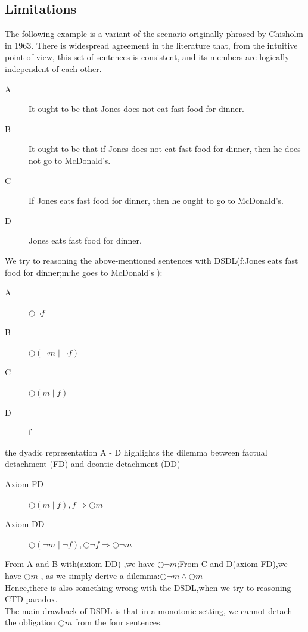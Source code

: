 \documentclass{article}
\begin{document}
\subsection{Limitations}
The following example is a variant of the scenario originally phrased by Chisholm in 1963. There is widespread agreement in the literature that, from the intuitive point of view, this set of sentences is consistent, and its members are logically independent of each other.
\begin{description}
\item[A]It ought to be that Jones does not eat fast food for dinner.
\item[B]It ought to be that if Jones does not eat fast food for dinner, then he does not go to McDonald’s.
\item[C] If Jones eats fast food for dinner, then he ought to go to McDonald’s.
\item[D]Jones eats fast food for dinner.
\end{description}
We try to reasoning the above-mentioned sentences with DSDL(f:Jones eats fast food for dinner;m:he goes to McDonald’s ):
\begin{description}
\item[A]$\bigcirc \neg f$
\item[B]$\bigcirc(\neg m \mid \neg f)$
\item[C]$\bigcirc(m\mid f)$
\item[D]f
\end{description}
the dyadic representation A - D highlights the dilemma between factual detachment (FD) and deontic detachment (DD)
\begin{description}
\item[Axiom FD]$\bigcirc(m\mid f),f \Rightarrow \bigcirc m$\\
\item[Axiom DD]$\bigcirc(\neg m \mid \neg f), \bigcirc\neg f \Rightarrow \bigcirc\neg m$\\
\end{description}

From A and B with(axiom DD) ,we have $\bigcirc\neg  m$;From C and D(axiom FD),we have $\bigcirc m$ , as we simply derive a dilemma:$\bigcirc\neg m\wedge\bigcirc m$\\
Hence,there is also something wrong with the DSDL,when we try to reasoning CTD paradox.\\
The main drawback of DSDL is that in a monotonic setting, we cannot detach
the obligation $\bigcirc m$ from the four sentences.
\end{document}
